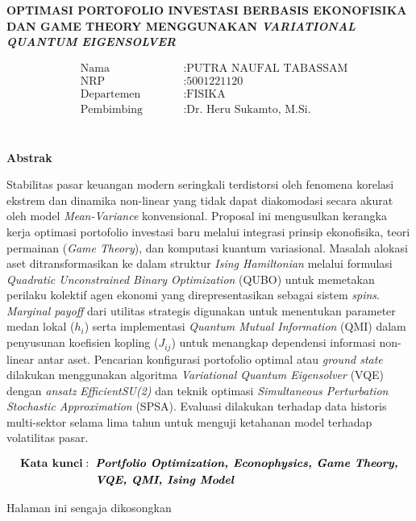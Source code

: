 \begin{center}
	\large{\textbf{OPTIMASI PORTOFOLIO INVESTASI BERBASIS EKONOFISIKA DAN GAME THEORY MENGGUNAKAN \textit{VARIATIONAL QUANTUM EIGENSOLVER}}}
\end{center}
\begin{minipage}{5cm}
\begin{align*}
&\text{Nama} \qquad &&: \text{PUTRA NAUFAL TABASSAM} \\
&\text{NRP} \qquad &&: \text{5001221120} \\
&\text{Departemen} \qquad &&: \text{FISIKA} \\
&\text{Pembimbing} \qquad &&: \text{Dr. Heru Sukamto, M.Si.} \\
\end{align*}
\end{minipage} \\
\textbf{Abstrak} 
\par Stabilitas pasar keuangan modern seringkali terdistorsi oleh fenomena korelasi ekstrem dan dinamika non-linear yang tidak dapat diakomodasi secara akurat oleh model \textit{Mean-Variance} konvensional. Proposal ini mengusulkan kerangka kerja optimasi portofolio investasi baru melalui integrasi prinsip ekonofisika, teori permainan (\textit{Game Theory}), dan komputasi kuantum variasional. Masalah alokasi aset ditransformasikan ke dalam struktur \textit{Ising Hamiltonian} melalui formulasi \textit{Quadratic Unconstrained Binary Optimization} (QUBO) untuk memetakan perilaku kolektif agen ekonomi yang direpresentasikan sebagai sistem \textit{spins}. \textit{Marginal payoff} dari utilitas strategis digunakan untuk menentukan parameter medan lokal ($h_i$) serta implementasi \textit{Quantum Mutual Information} (QMI) dalam penyusunan koefisien kopling ($J_{ij}$) untuk menangkap dependensi informasi non-linear antar aset. Pencarian konfigurasi portofolio optimal atau \textit{ground state} dilakukan menggunakan algoritma \textit{Variational Quantum Eigensolver} (VQE) dengan \textit{ansatz} \textit{EfficientSU(2)} dan teknik optimasi \textit{Simultaneous Perturbation Stochastic Approximation} (SPSA). Evaluasi dilakukan terhadap data historis multi-sektor selama lima tahun untuk menguji ketahanan model terhadap volatilitas pasar. 

\begin{minipage}{1cm}
	\begin{align*}
	\text{\textbf{Kata kunci}}:\hspace{2mm}&\text{\textbf{\textit{Portfolio Optimization, Econophysics, Game Theory,}}} \\
	&\text{\textbf{\textit{VQE, QMI, Ising Model}}}
	\end{align*}
\end{minipage}

\newpage
\thispagestyle{empty}
\vspace*{\fill}
    \begin{center}
	Halaman ini sengaja dikosongkan
    \end{center}
\vspace*{\fill}
\pagebreak
